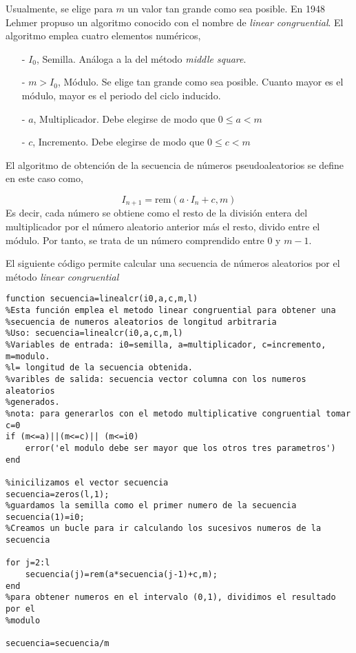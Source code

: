 Usualmente, se elige para $m$ un valor tan grande como sea posible. 
En 1948 Lehmer propuso un algoritmo conocido con el nombre de \emph{linear congruential}. El algoritmo emplea cuatro elementos numéricos,

\begin{itemize}
\item[-] $I_0$, Semilla. Análoga a la del método \emph{middle square}.
\item[-] $m > I_0$, Módulo.  Se elige tan grande como sea posible. Cuanto mayor es el módulo, mayor es el periodo del ciclo inducido.
\item[-] $a$, Multiplicador. Debe elegirse de modo que $0\le a < m$
\item[-] $c$, Incremento. Debe elegirse de modo que $0\le c < m$
\end{itemize}
 
El algoritmo de obtención de la secuencia de números pseudoaleatorios se define en este caso como,

\begin{equation*}
I_{n+1}=\text{rem}(a\cdot I_n+c, m)
\end{equation*}
Es decir, cada número se obtiene como el resto de la división entera del multiplicador por el número aleatorio anterior más el resto, divido entre el módulo. Por tanto, se trata de un número comprendido entre $0$ y $m-1$. 

El siguiente código permite calcular una secuencia de números aleatorios por el método \emph{linear congruential}

\begin{verbatim}
function secuencia=linealcr(i0,a,c,m,l)
%Esta función emplea el metodo linear congruential para obtener una
%secuencia de numeros aleatorios de longitud arbitraria
%Uso: secuencia=linealcr(i0,a,c,m,l)
%Variables de entrada: i0=semilla, a=multiplicador, c=incremento, m=modulo.
%l= longitud de la secuencia obtenida.
%varibles de salida: secuencia vector columna con los numeros aleatorios
%generados.
%nota: para generarlos con el metodo multiplicative congruential tomar c=0
if (m<=a)||(m<=c)|| (m<=i0)
    error('el modulo debe ser mayor que los otros tres parametros')
end

%inicilizamos el vector secuencia
secuencia=zeros(l,1);
%guardamos la semilla como el primer numero de la secuencia
secuencia(1)=i0;
%Creamos un bucle para ir calculando los sucesivos numeros de la secuencia

for j=2:l
    secuencia(j)=rem(a*secuencia(j-1)+c,m);
end
%para obtener numeros en el intervalo (0,1), dividimos el resultado por el
%modulo

secuencia=secuencia/m
\end{verbatim}

